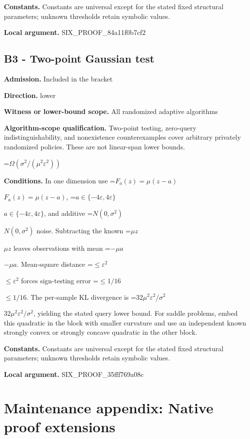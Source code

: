\documentclass[10pt,a4paper]{article}
\newcommand{\AtlasMath}[1]{\par\begingroup\centering\setbox0=\hbox{$\displaystyle #1$}\ifdim\wd0>1.4\linewidth\typeout{ATLAS WIDE FORMULA: \the\wd0}\fi\ifdim\wd0>\linewidth\resizebox{\linewidth}{!}{\box0}\else\box0\fi\par\endgroup}
\newcommand{\AtlasInlineMath}[1]{\begingroup\setbox0=\hbox{$#1$}\ifdim\wd0>.4\linewidth\endgroup\AtlasMath{#1}\else\endgroup$#1$\fi}
\begin{document}
\textbf{Constants.} Constants are universal except for the stated fixed structural parameters; unknown thresholds retain symbolic values.



\textbf{Local argument.} SIX\_PROOF\_84a11f0b7cf2



\subsection{B3 - Two-point Gaussian test}


\textbf{Admission.} Included in the bracket



\textbf{Direction.} lower



\textbf{Witness or lower-bound scope.} All randomized adaptive algorithms



\textbf{Algorithm-scope qualification.} Two-point testing, zero-query indistinguishability, and nonexistence counterexamples cover arbitrary privately randomized policies. These are not linear-span lower bounds.



\AtlasMath{\Omega(\sigma^2/(\mu^2\varepsilon^2))}


\textbf{Conditions.} In one dimension use \AtlasInlineMath{F_a(z)=\mu(z-a)}, \AtlasInlineMath{a\in\{-4\varepsilon,4\varepsilon\}}, and additive \AtlasInlineMath{N(0,\sigma^2)} noise. Subtracting the known \AtlasInlineMath{\mu z} leaves observations with mean \AtlasInlineMath{-\mu a}. Mean-square distance \AtlasInlineMath{\le\varepsilon^2} forces sign-testing error \AtlasInlineMath{\le1/16}. The per-sample KL divergence is \AtlasInlineMath{32\mu^2\varepsilon^2/\sigma^2}, yielding the stated query lower bound. For saddle problems, embed this quadratic in the block with smaller curvature and use an independent known strongly convex or strongly concave quadratic in the other block.



\textbf{Constants.} Constants are universal except for the stated fixed structural parameters; unknown thresholds retain symbolic values.



\textbf{Local argument.} SIX\_PROOF\_35fff769a08c



\section{Maintenance appendix: Native proof extensions}
\end{document}
